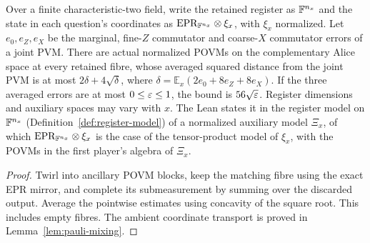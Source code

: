 \begin{lemma}
\label{lem:pauli-mixing-coordinates}
\leanok
Over a finite characteristic-two field, write the retained register as
$\mathbb{F}^{n_x}$ and the state in each question's coordinates as
$\mathrm{EPR}_{\mathbb{F}^{n_x}}\otimes\xi_x$, with $\xi_x$ normalized.
Let $e_0,e_Z,e_X$ be the marginal, fine-$Z$ commutator and coarse-$X$
commutator errors of a joint PVM. There are actual normalized POVMs on
the complementary Alice space at every retained fibre, whose averaged
squared distance from the joint PVM is at most
$2\delta+4\sqrt\delta$, where
$\delta=\mathbb E_x(2e_0+8e_Z+8e_X)$.
If the three averaged errors are at most $0\leq\varepsilon\leq1$, the bound is
$56\sqrt{\varepsilon}$. Register dimensions and auxiliary spaces may vary with $x$.
The Lean states it in the register model on $\mathbb{F}^{n_x}$ (Definition~\ref{def:register-model}) of a
normalized auxiliary model $\Xi_x$, of which $\mathrm{EPR}_{\mathbb{F}^{n_x}}\otimes\xi_x$ is the case of
the tensor-product model of $\xi_x$, with the POVMs in the first player's algebra of $\Xi_x$.
\end{lemma}
\begin{proof}
\leanok
Twirl into ancillary POVM blocks, keep the matching fibre using the exact
EPR mirror, and complete its submeasurement by summing over the discarded
output. Average the pointwise estimates using concavity of the square root.
This includes empty fibres. The ambient coordinate transport is proved in
Lemma~\ref{lem:pauli-mixing}.
\end{proof}

